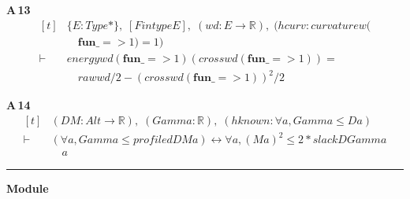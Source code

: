 \noindent\textbf{A\,13}\quad{}
{\footnotesize\[ \begin{aligned}[t]
&\{ \mathit{E} : \mathit{Type}*\},\; [\mathit{Fintype} \mathit{E}],\; (\mathit{w} \mathit{d} : \mathit{E} \to \mathbb{R} ),\; (\mathit{hcurv} : \mathit{curvature} \mathit{w} (\\
&\quad \mathbf{fun} \mathit{\_} => 1) = 1)\\
\vdash\;&\mathit{energy} \mathit{w} \mathit{d} (\mathbf{fun} \mathit{\_} => 1) (\mathit{cross} \mathit{w} \mathit{d} (\mathbf{fun} \mathit{\_} => 1)) =\\
&\quad \mathit{raw} \mathit{w} \mathit{d} / 2 - (\mathit{cross} \mathit{w} \mathit{d} (\mathbf{fun} \mathit{\_} => 1))^{2} / 2
\end{aligned} \]}

\noindent\textbf{A\,14}\quad{}
{\footnotesize\[ \begin{aligned}[t]
&(\mathit{D} \mathit{M} : \mathit{Alt} \to \mathbb{R} ),\; (\mathit{Gamma} : \mathbb{R} ),\; (\mathit{hknown} : \forall \mathit{a}, \mathit{Gamma} \leq \mathit{D} \mathit{a})\\
\vdash\;&(\forall \mathit{a}, \mathit{Gamma} \leq \mathit{profiled} \mathit{D} \mathit{M} \mathit{a}) \leftrightarrow \forall \mathit{a}, (\mathit{M} \mathit{a})^{2} \leq 2 * \mathit{slack} \mathit{D} \mathit{Gamma}\\
&\quad \mathit{a}
\end{aligned} \]}

\vspace{4pt}\noindent\rule{\columnwidth}{0.4pt}\par\vspace{2pt}
\noindent\textbf{Module }\par\vspace{3pt}

